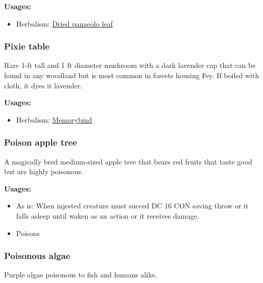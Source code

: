 \vspace{5mm}

\textbf{Usages:}

\begin{itemize}[noitemsep]
\item[] Herbalism: \hyperref[Dried panaeolo leaf]{Dried panaeolo leaf}
\end{itemize}

\subsubsection{Pixie table}
\label{Pixie table}

Rare 1-ft tall and 1 ft diameter mushroom with a dark lavender cap that can be found in any woodland but is most common in forests housing Fey. If boiled with cloth, it dyes it lavender.

\vspace{5mm}

\textbf{Usages:}

\begin{itemize}[noitemsep]
\item[] Herbalism: \hyperref[Memorybind]{Memorybind}
\end{itemize}

\subsubsection{Poison apple tree}
\label{Poison apple tree}

A magically bred medium-sized apple tree that bears red fruits that taste good but are highly poisonous.

\vspace{5mm}

\textbf{Usages:}

\begin{itemize}[noitemsep]
\item[] As is: When injested creature must succed DC 16 CON saving throw or it falls asleep until waken as an action or it receives damage.
\item[] Poisons \poison\poison
\end{itemize}

\subsubsection{Poisonous algae}
\label{Poisonous algae}

Purple algae poisonous to fish and humans alike.

